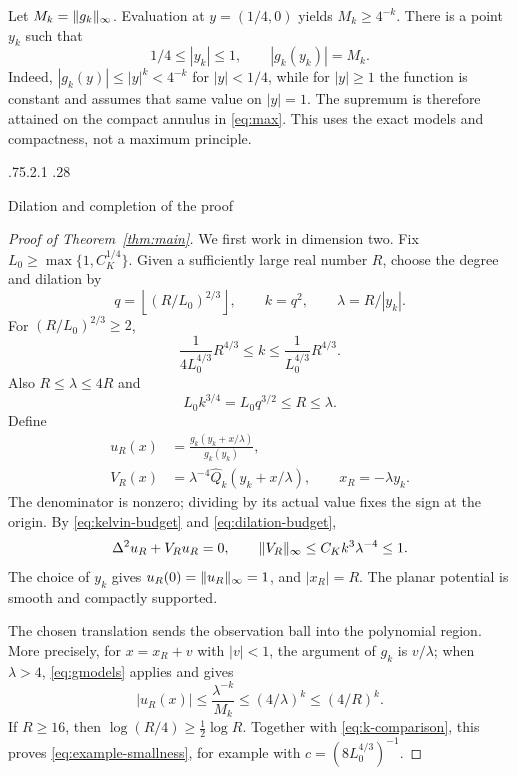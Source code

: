 \documentclass[11pt,a4paper,leqno]{amsart}
\makeatletter
\numberwithin{equation}{section}
\theoremstyle{landisplain}
\theoremstyle{landisdefinition}
\theoremstyle{landisremark}
\DeclarePairedDelimiter{\norm}{\lVert}{\rVert}
\renewcommand\subsection{\@startsection{subsection}{2}{\z@}%
  {.75\baselineskip \@plus .2\baselineskip \@minus .1\baselineskip}%
  {.28\baselineskip}%
  {\normalfont\bfseries\raggedright}}
\makeatother
\begin{document}
Let $M_k=\norm{g_k}_\infty$. Evaluation at $y=(1/4,0)$ yields
$M_k\ge4^{-k}$. There is a point $y_k$ such that
\begin{equation}\label{eq:max}
 1/4\le|y_k|\le1,\qquad |g_k(y_k)|=M_k.
\end{equation}
Indeed, $|g_k(y)|\le|y|^k<4^{-k}$ for $|y|<1/4$, while
for $|y|\ge1$ the function is constant and assumes that same
value on $|y|=1$. The supremum is therefore attained on the
compact annulus in \eqref{eq:max}. This uses the exact models
and compactness, not a maximum principle.

\subsection{Dilation and completion of the proof}

\begin{proof}[Proof of Theorem~\ref{thm:main}]
We first work in dimension two. Fix
$L_0\ge\max\{1,C_K^{1/4}\}$. Given a sufficiently large
real number $R$, choose the degree and dilation by
\begin{equation}\label{eq:parameters}
 q=\left\lfloor(R/L_0)^{2/3}\right\rfloor,\qquad
 k=q^2,\qquad \lambda=R/|y_k|.
\end{equation}
For $(R/L_0)^{2/3}\ge2$,
\begin{equation}\label{eq:k-comparison}
 \frac{1}{4L_0^{4/3}}R^{4/3}\le k
       \le\frac{1}{L_0^{4/3}}R^{4/3}.
\end{equation}
Also $R\le\lambda\le4R$ and
\begin{equation}\label{eq:dilation-budget}
 L_0k^{3/4}=L_0q^{3/2}\le R\le\lambda.
\end{equation}
Define
\begin{equation}\label{eq:final-pair}
 \begin{aligned}
 u_R(x)&=\frac{g_k(y_k+x/\lambda)}{g_k(y_k)},\\
 V_R(x)&=\lambda^{-4}\widehat Q_k(y_k+x/\lambda),
 \qquad x_R=-\lambda y_k.
 \end{aligned}
\end{equation}
The denominator is nonzero; dividing by its actual value fixes
the sign at the origin. By \eqref{eq:kelvin-budget} and
\eqref{eq:dilation-budget},
\[
 \Delta^2u_R+V_Ru_R=0,\qquad
 \norm{V_R}_\infty\le C_Kk^3\lambda^{-4}\le1.
\]
The choice of $y_k$ gives $u_R(0)=\norm{u_R}_\infty=1$, and
$|x_R|=R$. The planar potential is smooth and compactly supported.

The chosen translation sends the observation ball into the
polynomial region. More precisely, for $x=x_R+v$ with $|v|<1$,
the argument of $g_k$ is $v/\lambda$; when $\lambda>4$,
\eqref{eq:gmodels} applies and gives
\begin{equation}\label{eq:ball-estimate}
 |u_R(x)|\le\frac{\lambda^{-k}}{M_k}
 \le(4/\lambda)^k\le(4/R)^k.
\end{equation}
If $R\ge16$, then $\log(R/4)\ge\tfrac12\log R$.
Together with \eqref{eq:k-comparison}, this proves
\eqref{eq:example-smallness}, for example with
$c=(8L_0^{4/3})^{-1}$.


\end{proof}
\end{document}
